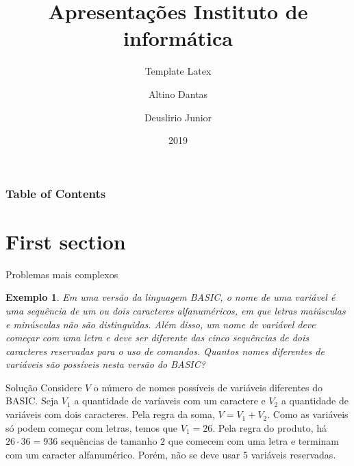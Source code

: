 \documentclass[aspectratio=169,t]{beamer}
\newtheorem{ex}{Exemplo}
\begin{document}
\title[Inf UFG]{Apresentações Instituto de informática}
\subtitle{Template Latex}

\author{Altino Dantas \and Deuslirio Junior}

\date{2019}
\frame[noframenumbering]{\titlepage}





\begin{frame}
\frametitle{Table of Contents}
\tableofcontents
\end{frame}


\section{First section}

 \begin{frame}{Problemas mais complexos}
\footnotesize
  \begin{ex}
Em uma versão da linguagem BASIC, o nome de uma variável é uma sequência de um ou dois caracteres alfanuméricos, em que letras maiúsculas e minúsculas não são distinguidas. Além disso, um nome de variável deve começar com uma letra e deve ser diferente das cinco sequências de dois caracteres reservadas para o uso de comandos. Quantos nomes diferentes de variáveis são possíveis nesta versão do BASIC?
  \end{ex}

\begin{block}{Solução}
Considere $V$ o número de nomes possíveis de variáveis diferentes do BASIC. Seja $V_1$ a quantidade de varíaveis com um caractere e $V_2$ a quantidade de variáveis com dois caracteres. Pela regra da soma, $V=V_1+V_2$. Como as variáveis só podem começar com letras, temos que $V_1=26$. Pela regra do produto, há $26\cdot 36=936$ sequências de tamanho $2$ que comecem com uma letra e terminam com um caracter alfanumérico. Porém, não se deve usar $5$ variáveis reservadas.
  \end{block}

 \end{frame}
 
\end{document}
